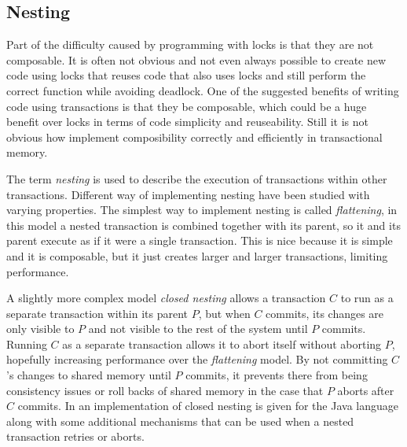 \subsection{Nesting}
Part of the difficulty caused by programming with locks is that they are not composable.
It is often not obvious and not even always possible to create new code using locks that
 reuses code that also uses locks and still perform the correct function while avoiding deadlock.
One of the suggested benefits of writing code using transactions is that they be composable,
 which could be a huge benefit over locks in terms of code simplicity and reuseability.
Still it is not obvious how implement composibility correctly and efficiently in transactional memory.

The term \emph{nesting} is used to describe the execution of transactions within other transactions.
Different way of implementing nesting have been studied with varying properties.
The simplest way to implement nesting is called \emph{flattening}, in this model a nested
 transaction is combined together with its parent, so it and its parent execute as if it were a single transaction.
This is nice because it is simple and it is composable, but it just creates larger and larger transactions, limiting performance.

A slightly more complex model \emph{closed nesting} allows a transaction $C$ to run as a separate
 transaction within its parent $P$, but when $C$ commits, its changes are only visible 
to $P$ and not visible to the rest of the system until $P$ commits.
Running $C$ as a separate transaction allows it to abort itself without aborting $P$, 
hopefully increasing performance over the \emph{flattening} model.
By not committing $C$'s changes to shared memory until $P$ commits, it prevents there 
from being consistency issues or roll backs of shared memory in the case that $P$ aborts after $C$ commits.
In \cite{1133985} an implementation of closed nesting is given for the Java language
 along with some additional mechanisms that can be used when a nested transaction retries or aborts.

